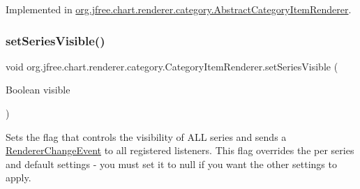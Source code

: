 Implemented in \mbox{\hyperlink{classorg_1_1jfree_1_1chart_1_1renderer_1_1category_1_1_abstract_category_item_renderer_ad4d7d645eac3287a01ebfaa2bf9776ac}{org.\+jfree.\+chart.\+renderer.\+category.\+Abstract\+Category\+Item\+Renderer}}.

\mbox{\label{interfaceorg_1_1jfree_1_1chart_1_1renderer_1_1category_1_1_category_item_renderer_aefe9bb9b43af3cb3b3c72a69af4e1d94}} 
\subsubsection{\texorpdfstring{set\+Series\+Visible()}{setSeriesVisible()}\hspace{0.1cm}{\footnotesize\ttfamily [1/4]}}
{\footnotesize\ttfamily void org.\+jfree.\+chart.\+renderer.\+category.\+Category\+Item\+Renderer.\+set\+Series\+Visible (\begin{DoxyParamCaption}\item[{Boolean}]{visible }\end{DoxyParamCaption})}

Sets the flag that controls the visibility of A\+LL series and sends a \mbox{\hyperlink{}{Renderer\+Change\+Event}} to all registered listeners. This flag overrides the per series and default settings -\/ you must set it to {\ttfamily null} if you want the other settings to apply.


